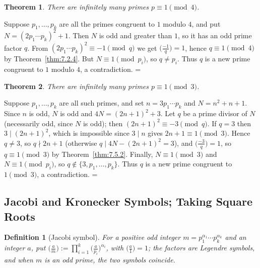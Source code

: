 \documentclass[11pt]{article}
\makeatletter
\let\nt@closedisplay\]
\def\nt@guardedclose{\@ifnextchar\par{\nt@closeafterpar}{\@ifnextchar\end{\postdisplaypenalty\@M\nt@closedisplay}{\nt@closedisplay}}}
\def\nt@closeafterpar\par{\@ifnextchar\par{\nt@closeafterpar}{\@ifnextchar\end{\postdisplaypenalty\@M\nt@closedisplay\par}{\nt@closedisplay\par}}}
\renewenvironment{proof}[1][\proofname]{\par
  \pushQED{\qed}\normalfont\topsep\medskipamount\edef\nt@afterproof{\@endparpenalty=\the\@endparpenalty\relax}\@beginparpenalty\@M\@endparpenalty\@M\let\]\nt@guardedclose\trivlist\item[]\textit{#1\@addpunct{.}} \ignorespaces}{\ifvmode\addpenalty\@M\fi\popQED\nt@afterproof\endtrivlist\@endpefalse}
\theoremstyle{ntstyle}
\newtheorem{theorem}{Theorem}[subsection]
\newtheorem{definition}{Definition}[subsection]
\newcommand{\legs}[2]{\bigl(\tfrac{#1}{#2}\bigr)}
\makeatother
\begin{document}
\begin{theorem}\label{thm:7.5.3} There are infinitely many primes $p \equiv 1 \pmod{4}$.

\end{theorem}

\begin{proof} Suppose $p_1, \ldots, p_k$ are all the primes congruent to $1$ modulo $4$,
  and put $N = (2 p_1 \cdots p_k)^2 + 1$. Then $N$ is odd and greater than $1$, so
  it has an odd prime factor $q$. From $(2p_1\cdots p_k)^2 \equiv -1 \pmod{q}$ we get $\legs{-1}{q} = 1$, hence
  $q \equiv 1 \pmod{4}$ by Theorem~\ref{thm:7.2.4}. But $N \equiv 1 \pmod{p_i}$, so $q \neq p_i$. Thus $q$ is a new
  prime
  congruent to $1$ modulo $4$, a contradiction.
\end{proof}

\begin{theorem}\label{thm:7.5.4} There are infinitely many primes $p \equiv 1 \pmod{3}$.

\end{theorem}

\begin{proof} Suppose $p_1, \ldots, p_k$ are all such
  primes, and set $n = 3 p_1 \cdots p_k$ and $N = n^2 + n + 1$. Since $n$
  is odd, $N$ is odd and $4N = (2n+1)^2 + 3$. Let $q$ be a prime divisor of $N$ (necessarily odd, since $N$ is odd); then
  $(2n+1)^2 \equiv -3 \pmod{q}$. If $q = 3$ then $3 \mid (2n+1)^2$,
  which is impossible since $3 \mid n$ gives $2n+1 \equiv 1 \pmod{3}$. Hence $q \neq 3$, so $q \nmid 2n+1$
  (otherwise $q \mid 4N-(2n+1)^2 = 3$), and $\legs{-3}{q} = 1$, so $q \equiv 1 \pmod{3}$ by
  Theorem~\ref{thm:7.5.2}. Finally, $N \equiv 1 \pmod{3}$ and $N \equiv 1 \pmod{p_i}$, so
  $q \notin \{3, p_1, \ldots, p_k\}$. Thus $q$ is a new prime congruent to $1 \pmod{3}$,
  a contradiction.
\end{proof}

\subsection{Jacobi and Kronecker Symbols; Taking Square Roots}

\begin{definition}[Jacobi symbol]\label{def:7.6.1}\label{def:jacobi-symbol} For a positive
  odd integer $m = p_1^{\alpha_1} \cdots p_k^{\alpha_k}$ and an integer
  $a$, put $\legs{a}{m} := \prod_{i=1}^{k}\legs{a}{p_i}^{\alpha_i}$, with $\legs{a}{1} = 1$; the
  factors are Legendre symbols, and when $m$ is an odd prime, the two symbols coincide.

\end{definition}
\end{document}
